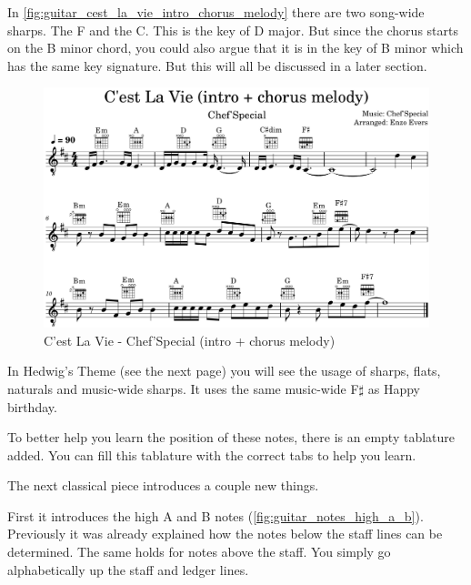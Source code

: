 In \autoref{fig:guitar_cest_la_vie_intro_chorus_melody} there are two song-wide sharps. The F and the C. This is the key of D major. But since the chorus starts on the B minor chord, you could also argue that it is in the key of B minor which has the same key signature. But this will all be discussed in a later section.

\begin{figure}[h]
	\centering
	\includegraphics[width=\textwidth]{../../MuseScore/Guitar/GuitarCestLaVieChefSpecial_IntroChorus.png}
	\caption{C'est La Vie - Chef'Special (intro + chorus melody)}
	\label{fig:guitar_cest_la_vie_intro_chorus_melody}
\end{figure}

In Hedwig's Theme (see the next page) you will see the usage of sharps, flats, naturals and music-wide sharps. It uses the same music-wide F$\sharp$ as Happy birthday.

To better help you learn the position of these notes, there is an empty tablature added. You can fill this tablature with the correct tabs to help you learn.



The next classical piece introduces a couple new things.

First it introduces the high A and B notes (\autoref{fig:guitar_notes_high_a_b}). Previously it was already explained how the notes below the staff lines can be determined. The same holds for notes above the staff. You simply go alphabetically up the staff and ledger lines.

